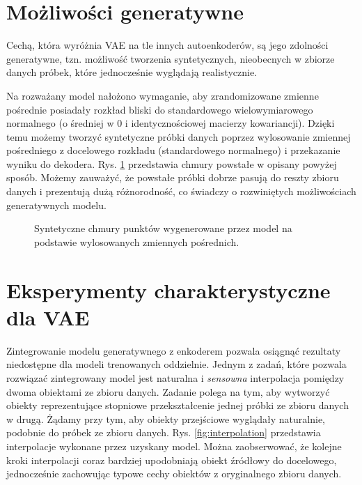 \documentclass{iithesis}
\begin{document}
\section{Możliwości generatywne}
Cechą, która wyróżnia VAE na tle innych autoenkoderów, są jego zdolności generatywne, tzn.
możliwość tworzenia syntetycznych, nieobecnych w zbiorze danych próbek, które jednocześnie wyglądają
realistycznie.

Na rozważany model nałożono wymaganie, aby zrandomizowane zmienne pośrednie posiadały rozkład
bliski do standardowego wielowymiarowego normalnego (o średniej w 0 i identycznościowej macierzy
kowariancji). Dzięki temu możemy tworzyć syntetyczne próbki danych poprzez wylosowanie zmiennej
pośredniego z docelowego rozkładu (standardowego normalnego) i przekazanie wyniku do dekodera.
Rys. \ref{fig:random_generated} przedstawia chmury powstałe w opisany powyżej sposób.
Możemy zauważyć, że powstałe próbki dobrze pasują do reszty zbioru danych i prezentują
dużą różnorodność, co świadczy o rozwiniętych możliwościach generatywnych modelu.

\begin{figure}
    \caption{\label{fig:random_generated} Syntetyczne chmury punktów wygenerowane
    przez model na podstawie wylosowanych zmiennych pośrednich. }
\end{figure}

\section{Eksperymenty charakterystyczne dla VAE}
Zintegrowanie modelu generatywnego z enkoderem pozwala osiągnąć rezultaty niedostępne dla modeli trenowanych
oddzielnie. Jednym z zadań, które pozwala rozwiązać zintegrowany model jest naturalna i \textit{sensowna}
interpolacja pomiędzy dwoma obiektami ze zbioru danych. Zadanie polega na tym, aby wytworzyć obiekty
reprezentujące stopniowe przekształcenie jednej próbki ze zbioru danych w drugą. Żądamy przy tym, aby
obiekty przejściowe wyglądały naturalnie, podobnie do próbek ze zbioru danych.
Rys. \ref{fig:interpolation} przedstawia interpolacje wykonane przez uzyskany model.
Można zaobserwować, że kolejne kroki interpolacji coraz bardziej upodobniają obiekt
źródłowy do docelowego, jednocześnie zachowując typowe cechy obiektów z oryginalnego zbioru danych.
\end{document}
